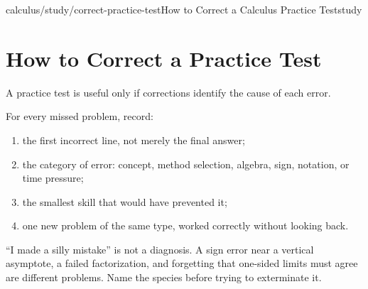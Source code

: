 \begin{webpage}{calculus/study/correct-practice-test}{How to Correct a Calculus Practice Test}{study}
\section{How to Correct a Practice Test}

A practice test is useful only if corrections identify the cause of each error.

For every missed problem, record:

\begin{enumerate}
  \item the first incorrect line, not merely the final answer;
  \item the category of error: concept, method selection, algebra, sign, notation, or time pressure;
  \item the smallest skill that would have prevented it;
  \item one new problem of the same type, worked correctly without looking back.
\end{enumerate}

\begin{bgconcept}
``I made a silly mistake'' is not a diagnosis. A sign error near a vertical asymptote, a failed factorization, and forgetting that one-sided limits must agree are different problems. Name the species before trying to exterminate it.
\end{bgconcept}
\end{webpage}

